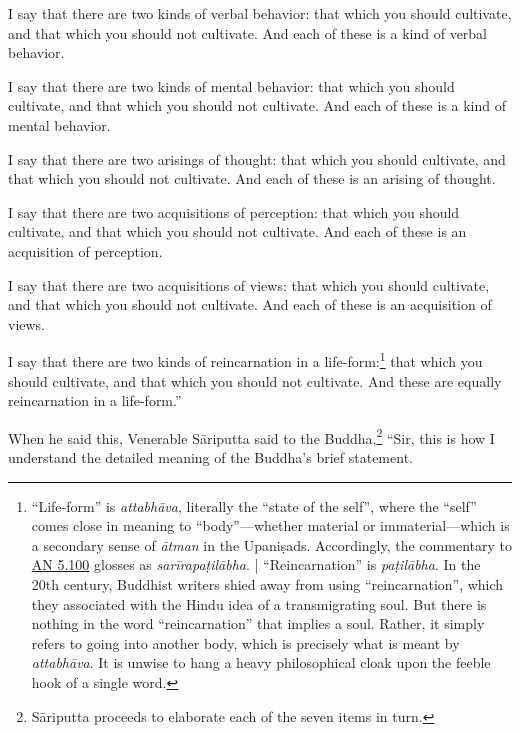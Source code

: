 \documentclass[12pt,openany]{book}%
\begin{document}
I say that there are two kinds of verbal behavior: that which you should cultivate, and that which you should not cultivate. And each of these is a kind of verbal behavior. 

I say that there are two kinds of mental behavior: that which you should cultivate, and that which you should not cultivate. And each of these is a kind of mental behavior. 

I say that there are two arisings of thought: that which you should cultivate, and that which you should not cultivate. And each of these is an arising of thought. 

I say that there are two acquisitions of perception: that which you should cultivate, and that which you should not cultivate. And each of these is an acquisition of perception. 

I say that there are two acquisitions of views: that which you should cultivate, and that which you should not cultivate. And each of these is an acquisition of views. 

I say that there are two kinds of reincarnation in a life-form:\footnote{“Life-form” is \textit{\textsanskrit{attabhāva}}, literally the “state of the self”, where the “self” comes close in meaning to “body”—whether material or immaterial—which is a secondary sense of \textit{\textsanskrit{ātman}} in the \textsanskrit{Upaniṣads}. Accordingly, the commentary to \href{https://suttacentral.net/an5.100/en/sujato}{AN 5.100} glosses as \textit{\textsanskrit{sarīrapaṭilābha}}. | “Reincarnation” is \textit{\textsanskrit{paṭilābha}}. In the 20th century, Buddhist writers shied away from using “reincarnation”, which they associated with the Hindu idea of a transmigrating soul. But there is nothing in the word “reincarnation” that implies a soul. Rather, it simply refers to going into another body, which is precisely what is meant by \textit{\textsanskrit{attabhāva}}. It is unwise to hang a heavy philosophical cloak upon the feeble hook of a single word. } that which you should cultivate, and that which you should not cultivate. And these are equally reincarnation in a life-form.” 

When he said this, Venerable \textsanskrit{Sāriputta} said to the Buddha,\footnote{\textsanskrit{Sāriputta} proceeds to elaborate each of the seven items in turn. } “Sir, this is how I understand the detailed meaning of the Buddha’s brief statement. 
\end{document}
